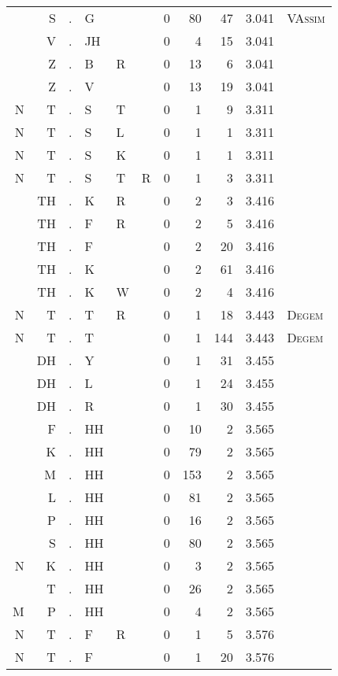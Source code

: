 \begin{longtable}{r@{ } r@{ } c@{ } l@{ } l@{ } l@{ } r r r r l }
  & S & . & G &   &   & 0 & 80 & 47 & 3.041 & \textsc{VAssim} \\
  & V & . & JH &   &   & 0 & 4 & 15 & 3.041 &  \\
  & Z & . & B & R &   & 0 & 13 & 6 & 3.041 &  \\
  & Z & . & V &   &   & 0 & 13 & 19 & 3.041 &  \\
N & T & . & S & T &   & 0 & 1 & 9 & 3.311 &  \\
N & T & . & S & L &   & 0 & 1 & 1 & 3.311 &  \\
N & T & . & S & K &   & 0 & 1 & 1 & 3.311 &  \\
N & T & . & S & T & R & 0 & 1 & 3 & 3.311 &  \\
  & TH & . & K & R &   & 0 & 2 & 3 & 3.416 &  \\
  & TH & . & F & R &   & 0 & 2 & 5 & 3.416 &  \\
  & TH & . & F &   &   & 0 & 2 & 20 & 3.416 &  \\
  & TH & . & K &   &   & 0 & 2 & 61 & 3.416 &  \\
  & TH & . & K & W &   & 0 & 2 & 4 & 3.416 &  \\
N & T & . & T & R &   & 0 & 1 & 18 & 3.443 & \textsc{Degem} \\
N & T & . & T &   &   & 0 & 1 & 144 & 3.443 & \textsc{Degem} \\
  & DH & . & Y &   &   & 0 & 1 & 31 & 3.455 &  \\
  & DH & . & L &   &   & 0 & 1 & 24 & 3.455 &  \\
  & DH & . & R &   &   & 0 & 1 & 30 & 3.455 &  \\
  & F & . & HH &   &   & 0 & 10 & 2 & 3.565 &  \\
  & K & . & HH &   &   & 0 & 79 & 2 & 3.565 &  \\
  & M & . & HH &   &   & 0 & 153 & 2 & 3.565 &  \\
  & L & . & HH &   &   & 0 & 81 & 2 & 3.565 &  \\
  & P & . & HH &   &   & 0 & 16 & 2 & 3.565 &  \\
  & S & . & HH &   &   & 0 & 80 & 2 & 3.565 &  \\
N & K & . & HH &   &   & 0 & 3 & 2 & 3.565 &  \\
  & T & . & HH &   &   & 0 & 26 & 2 & 3.565 &  \\
M & P & . & HH &   &   & 0 & 4 & 2 & 3.565 &  \\
N & T & . & F & R &   & 0 & 1 & 5 & 3.576 &  \\
N & T & . & F &   &   & 0 & 1 & 20 & 3.576 &  \\

\end{longtable}
